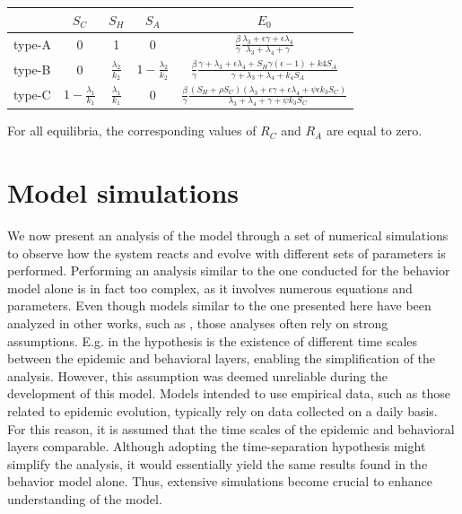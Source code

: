 \begin{center}
\begin{tabular}{|>{\centering\arraybackslash}m{1.2cm}|c|c|c|c|}
	\hline
	\rule[0ex]{0pt}{2.5ex}  & $S_C$ & $S_H$ & $S_A$ & $E_0$ \\
	\hline
	\rule[0ex]{0pt}{2.5ex} type-A & 0  & 1 & 0  
	& $\frac{\beta}{\gamma} \frac{\lambda_3+\epsilon \gamma + \epsilon \lambda_4}{\lambda_3 + \lambda_4 + \gamma}$  \\
	\hline
	\rule[0ex]{0pt}{2.5ex} type-B & 0 & $\frac{\lambda_2}{k_2}$ & $1- \frac{\lambda_2}{k_2}$  
	& 	$\frac{\beta}{\gamma} \frac{\gamma +\lambda_3+\epsilon \lambda_4 + S_H \gamma(\epsilon-1)+k4 S_A}{\gamma+\lambda_3+ \lambda_4+ k_4 S_A}$  \\
	\hline
	\rule[0ex]{0pt}{2.5ex} type-C & $1 -\frac{\lambda_1}{k_1}$ & $\frac{\lambda_1}{k_1}$ & 0 
	& $ \frac{\beta}{\gamma} \frac{(S_H+ \rho S_C)(\lambda_3+\epsilon \gamma + \epsilon \lambda_4+ \psi \epsilon k_3 S_C)}{\lambda_3 + \lambda_4 + \gamma + \psi k_3 S_C}  $  \\
	\hline
\end{tabular}
\end{center}


For all equilibria, the corresponding values of $R_C$ and $R_A$ are equal to zero.

\section{Model simulations}
We now present an analysis of the model through a set of numerical simulations to observe how the system reacts and evolve with different sets of parameters is performed.
Performing an analysis similar to the one conducted for the behavior model alone is in fact too complex, as it involves numerous equations and parameters. Even though models similar to the one presented here have been analyzed in other works, such as \cite{Bulai2023}, those analyses often rely on strong assumptions. E.g. in \cite{Bulai2023} the hypothesis is the existence of different time scales between the epidemic and behavioral layers, enabling the simplification of the analysis. However, this assumption was deemed unreliable during the development of this model. Models intended to use empirical data, such as those related to epidemic evolution, typically rely on data collected on a daily basis. For this reason, it is assumed that the time scales of the epidemic and behavioral layers comparable. Although adopting the time-separation hypothesis might simplify the analysis, it would essentially yield the same results found in the behavior model alone. Thus, extensive simulations become crucial to enhance understanding of the model.

